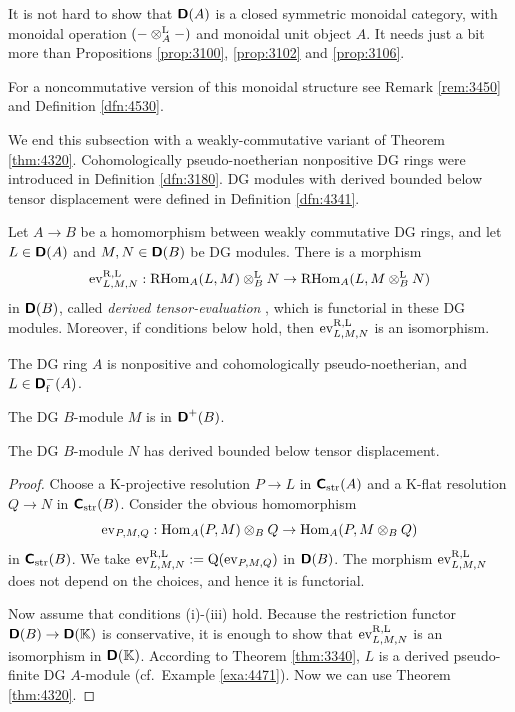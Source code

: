 \begin{rem} \label{rem:3100}
It is not hard to show that $\boldsymbol{\mathsf{D}}(A)$ is a closed symmetric monoidal 
category, with monoidal operation $(- \otimes^{\mathrm{L}}_{A} -)$ and monoidal unit 
object $A$. It needs just a bit more than Propositions \ref{prop:3100}, 
\ref{prop:3102} and \ref{prop:3106}. 

For a noncommutative version of this monoidal structure see 
Remark \ref{rem:3450} and Definition \ref{dfn:4530}.
\end{rem}

We end this subsection with a weakly-commutative variant of Theorem 
\ref{thm:4320}. Cohomologically pseudo-noether\-ian nonpositive DG rings were 
introduced in Definition \ref{dfn:3180}. 
DG modules with derived bounded below tensor displacement were defined in
Definition \ref{dfn:4341}.

\begin{thm} \label{thm:2700} 
Let $A \to B$ be a homomorphism between weakly commutative DG rings, and let
$L \in \boldsymbol{\mathsf{D}}(A)$ and $M, N \in \boldsymbol{\mathsf{D}}(B)$ be DG modules. 
There is a morphism 
\[ \operatorname{ev}^{\mathrm{R, L}}_{L, M, N} : \operatorname{RHom}_{A}(L, M) \otimes^{\mathrm{L}}_B N \to 
\operatorname{RHom}_{A}(L, M \otimes^{\mathrm{L}}_B N) \]
in $\boldsymbol{\mathsf{D}}(B)$, called {\em derived tensor-evaluation}%
,
which is functorial in these DG modules. Moreover, if conditions 
 below hold, then $\operatorname{ev}^{\mathrm{R, L}}_{L, M, N}$ is an 
isomorphism. 
\begin{enumerate}
 The DG ring $A$ is nonpositive and cohomologically 
pseudo-noetherian, and $L \in \boldsymbol{\mathsf{D}}^{-}_{\mathrm{f}}(A)$.

 The DG $B$-module $M$ is in $\boldsymbol{\mathsf{D}}^{+}(B)$.

  The DG $B$-module $N$ has derived bounded below tensor 
displacement.
\end{enumerate}
\end{thm}

\begin{proof}
Choose a K-projective resolution 
$P \to L$ in $\boldsymbol{\mathsf{C}}_{\mathrm{str}}(A)$ and a K-flat resolution 
$Q \to N$ in $\boldsymbol{\mathsf{C}}_{\mathrm{str}}(B)$. 
Consider the obvious homomorphism 
\[ \operatorname{ev}_{P, M, Q} : \operatorname{Hom}_{A}(P, M) \otimes_{B} Q \to 
\operatorname{Hom}_{A}(P, M \otimes_{B} Q) \]
in $\boldsymbol{\mathsf{C}}_{\mathrm{str}}(B)$. 
We take 
$\operatorname{ev}^{\mathrm{R, L}}_{L, M, N} := \operatorname{Q}(\operatorname{ev}_{P, M, Q})$
in $\boldsymbol{\mathsf{D}}(B)$. The morphism $\operatorname{ev}^{\mathrm{R, L}}_{L, M, N}$ does not 
depend on the choices, and hence it is functorial. 

Now assume that conditions (i)-(iii) hold. Because the restriction functor \lb 
$\boldsymbol{\mathsf{D}}(B) \to \boldsymbol{\mathsf{D}}(\mathbb{K})$ is conservative, it is enough to show that 
$\operatorname{ev}^{\mathrm{R, L}}_{L, M, N}$ is an isomorphism in $\boldsymbol{\mathsf{D}}(\mathbb{K})$.
According to Theorem \ref{thm:3340}, $L$ is a derived pseudo-finite DG 
$A$-module (cf.\ Example \ref{exa:4471}). Now we can use Theorem 
\ref{thm:4320}.
\end{proof}











